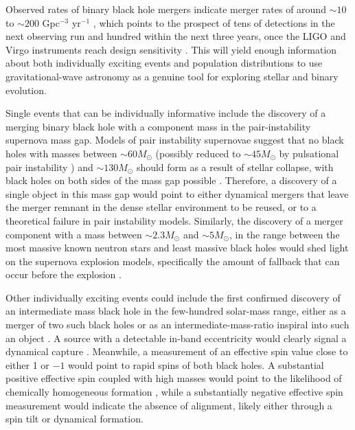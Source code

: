 \documentclass[iop,onecolumn]{revtex4}
\begin{document}
Observed rates of binary black hole mergers indicate merger rates of around $\sim 10$ to $\sim 200$ Gpc$^{-3}$ yr$^{-1}$ \citep{GW150914:rates,GW170104}, which points to the prospect of tens of detections in the next observing run and hundred within the next three years, once the LIGO and Virgo instruments reach design sensitivity \citep{scenarios}.  This will yield enough information about both individually exciting events and population distributions to use gravitational-wave astronomy as a genuine tool for exploring stellar and binary evolution.  

Single events that can be individually informative include the discovery of a merging binary black hole with a component mass in the pair-instability supernova mass gap.  Models of pair instability supernovae suggest that no black holes with masses between $\sim 60 M_\odot$ (possibly reduced to $\sim 45 M_\odot$ by pulsational pair instability \citep{Woosley}) and $\sim 130 M_\odot$ should form as a result of stellar collapse, with black holes on both sides of the mass gap possible \citep{Marchant:2016}.  Therefore, a discovery of a single object in this mass gap would point to either dynamical mergers that leave the merger remnant in the dense stellar environment to be reused, or to a theoretical failure in pair instability models.  Similarly, the discovery of a merger component with a mass between $\sim 2.3 M_\odot$ and $\sim 5 M_\odot$, in the range between the most massive known neutron stars and least massive black holes \citep{Ozel:2010,Farr:2011} would shed light on the supernova explosion models, specifically the amount of fallback that can occur before the explosion \citep{Fryer:2011}.

Other individually exciting events could include the first confirmed discovery of an intermediate mass black hole in the few-hundred solar-mass range, either as a merger of two such black holes \citep[e.g.,][]{Veitch:2015,Graff:2015} or as an intermediate-mass-ratio inspiral into such an object \citep[e.g.,][]{Haster:2015IMRI,Haster:2016}.  A source with a detectable in-band eccentricity would clearly signal a dynamical capture \citep{Breivik:2016}.  Meanwhile, a measurement of an effective spin value close to either 1 or $-1$ would point to rapid spins of both black holes.  A substantial positive effective spin coupled with high masses would point to the likelihood of chemically homogeneous formation \citep{Marchant:2016}, while a substantially negative effective spin measurement would indicate the absence of alignment, likely either through a spin tilt or dynamical formation.  
\end{document}
